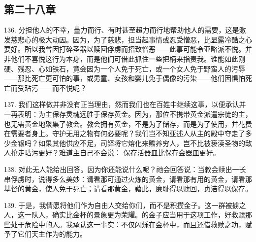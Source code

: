 
\subsection{第二十八章}

\par

136. 分担他人的不幸，量力而行、有时甚至超力而行地帮助他人的需要，这是激发慈悲心的极大动因。因为，为了慈悲，担当起事情或忍受憎恶，比显露冷酷之心要好。所以我曾因打碎圣器以赎回俘虏而招致憎恶——此事可能令亚略派不悦。并非他们不喜悦这行为本身，而是他们可借此抓住一些把柄来指责我。谁能如此刚硬、残忍、心如铁石，竟会因为一个人免于死亡，或一个女人免于野蛮人的污辱——那比死亡更可怕的事，或男童、女孩和婴儿免于偶像的污染——他们因惧怕死亡而受玷污——而不悦呢？\par

137. 我们这样做并非没有正当理由，然而我们也在百姓中继续这事，以便承认并一再表明：为主保存灵魂远胜于保存黄金。因为，那位不携带黄金派遣宗徒的主，也无需黄金地聚集了教会。教会拥有黄金，不是为了储存，而是为了使用，并花费在需要者身上。守护无用之物有何必要呢？我们岂不知亚述人从主的殿中夺走了多少金银吗？如果其他供应不足，司铎将它熔化来赡养穷人，岂不比被亵渎圣物的敌人抢走玷污更好？难道主自己不会说： 保存活器皿比保存金器皿更好。\par

138. 对此无人能给出回答。因为你还能说什么呢？祂会回答说：当教会赎出一长串俘虏时，说得多么美妙：请看那可通过火炼的黄金，请看那有用的黄金，请看那基督的黄金，使人免于死亡；请看那黄金，藉此，廉耻得以赎回，贞洁得以保存。\par

139. 于是，我情愿将他们作为自由人交给你们，而不是积攒金子。这一群被掳之人，这一队人，确实比金杯的景象更为荣耀。的金子应当用于这项工作，好救赎那些处于危险中的人。我承认这一事实：不仅闪烁在金杯中，而且还借救赎之功，赋予了它们天主作为的能力。\par

